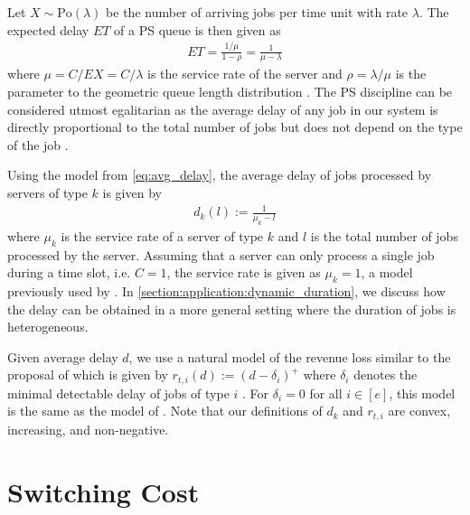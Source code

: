 Let $X \sim \text{Po}(\lambda)$ be the number of arriving jobs per time unit with rate $\lambda$. The expected delay $E T$ of a PS queue is then given as \begin{align}\label{eq:avg_delay}
    E T = \frac{1/\mu}{1-\rho} = \frac{1}{\mu - \lambda}
\end{align} where $\mu = C / E X = C / \lambda$ is the service rate of the server and $\rho = \lambda / \mu$ is the parameter to the geometric queue length distribution \cite{Virtamo2007}. The PS discipline can be considered utmost egalitarian as the average delay of any job in our system is directly proportional to the total number of jobs but does not depend on the type of the job \cite{Virtamo2007}.

Using the model from \autoref{eq:avg_delay}, the average delay of jobs processed by servers of type $k$ is given by \begin{align}\label{eq:delay}
    d_{k}(l) := \frac{1}{\mu_k - l}
\end{align} where $\mu_k$ is the service rate of a server of type $k$ and $l$ is the total number of jobs processed by the server. Assuming that a server can only process a single job during a time slot, i.e. $C = 1$, the service rate is given as $\mu_k = 1$, a model previously used by \citeauthor*{Lin2011} \cite{Lin2011, Lin2012}. In \autoref{section:application:dynamic_duration}, we discuss how the delay can be obtained in a more general setting where the duration of jobs is heterogeneous.

Given average delay $d$, we use a natural model of the revenue loss similar to the proposal of \citeauthor*{Lin2011} which is given by $r_{t,i}(d) := (d - \delta_i)^+$ where $\delta_i$ denotes the minimal detectable delay of jobs of type $i$ \cite{Lin2011}. For $\delta_i = 0$ for all $i \in [e]$, this model is the same as the model of \cite{Lin2012}. Note that our definitions of $d_k$ and $r_{t,i}$ are convex, increasing, and non-negative.

\section{Switching Cost}\label{section:application:switching_cost}

